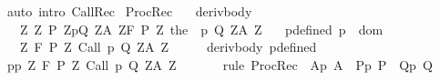 \begin{isabellebody}
%
\isadelimproof
%
\endisadelimproof
%
\isatagproof
{}\isamarkupfalse%
\ {\isacharparenleft}auto\ intro{\isacharcolon}\ CallRec{\isacharparenright}\isanewline
{}\isamarkupfalse%
%
\endisatagproof
{\isafoldproof}%
%
\isadelimproof
\isanewline
%
\endisadelimproof
\isanewline
\isanewline
{}\isamarkupfalse%
\ ProcRec{}{\isacharcolon}\isanewline
\ \ \ deriv{\isacharunderscore}body{\isacharcolon}\ \ \isanewline
\ \ \ {\isachardoublequoteopen}{\isasymforall}Z{\isachardot}\ {\isasymGamma}{\isacharcomma}{\isasymTheta}{\isasymunion}{\isacharparenleft}{\isasymUnion}Z{\isachardot}\ {\isacharbraceleft}{\isacharparenleft}P\ Z{\isacharcomma}p{\isacharcomma}Q\ Z{\isacharcomma}A\ Z{\isacharparenright}{\isacharbraceright}{\isacharparenright}{\isasymturnstile}\isactrlbsub {\isacharslash}F\isactrlesub \ {\isacharparenleft}P\ Z{\isacharparenright}\ {\isacharparenleft}the\ {\isacharparenleft}{\isasymGamma}\ p{\isacharparenright}{\isacharparenright}\ {\isacharparenleft}Q\ Z{\isacharparenright}{\isacharcomma}{\isacharparenleft}A\ Z{\isacharparenright}{\isachardoublequoteclose}\isanewline
\ \ \ p{\isacharunderscore}defined{\isacharcolon}\ {\isachardoublequoteopen}p\ {\isasymin}\ dom\ {\isasymGamma}{\isachardoublequoteclose}\isanewline
\ \ \ {\isachardoublequoteopen}{\isasymforall}Z{\isachardot}\ {\isasymGamma}{\isacharcomma}{\isasymTheta}{\isasymturnstile}\isactrlbsub {\isacharslash}F\isactrlesub \ {\isacharparenleft}P\ Z{\isacharparenright}\ Call\ p\ {\isacharparenleft}Q\ Z{\isacharparenright}{\isacharcomma}{\isacharparenleft}A\ Z{\isacharparenright}{\isachardoublequoteclose}\isanewline
%
\isadelimproof
%
\endisadelimproof
%
\isatagproof
{}\isamarkupfalse%
\ {\isacharminus}\isanewline
\ \ \isamarkupfalse%
\ deriv{\isacharunderscore}body\ p{\isacharunderscore}defined\isanewline
\ \ \isamarkupfalse%
\ {\isachardoublequoteopen}{\isasymforall}p{\isasymin}{\isacharbraceleft}p{\isacharbraceright}{\isachardot}\ {\isasymforall}Z{\isachardot}\ {\isasymGamma}{\isacharcomma}{\isasymTheta}{\isasymturnstile}\isactrlbsub {\isacharslash}F\isactrlesub \ {\isacharparenleft}P\ Z{\isacharparenright}\ Call\ p\ {\isacharparenleft}Q\ Z{\isacharparenright}{\isacharcomma}{\isacharparenleft}A\ Z{\isacharparenright}{\isachardoublequoteclose}\isanewline
\ \ \ \ \isamarkupfalse%
\ {\isacharminus}\ {\isacharparenleft}rule\ ProcRec\ {\isacharbrackleft}\ A{\isacharequal}{\isachardoublequoteopen}{\isasymlambda}p{\isachardot}\ A{\isachardoublequoteclose}\ \ P{\isacharequal}{\isachardoublequoteopen}{\isasymlambda}p{\isachardot}\ P{\isachardoublequoteclose}\ \ Q{\isacharequal}{\isachardoublequoteopen}{\isasymlambda}p{\isachardot}\ Q{\isachardoublequoteclose}{\isacharbrackright}{\isacharcomma}\isanewline

\end{isabellebody}
